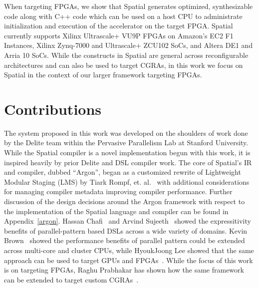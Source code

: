 When targeting FPGAs, we show that Spatial generates optimized, synthesizable
code along with C++ code which can be used on a host CPU to administrate
initialization and execution of the accelerator on the target FPGA.
Spatial currently supports Xilinx Ultrascale+ VU9P FPGAs on Amazon's
EC2 F1 Instances, Xilinx Zynq-7000 and Ultrascale+ ZCU102 SoCs, and Altera DE1 and Arria 10 SoCs.
While the constructs in Spatial are general across reconfigurable architectures
and can also be used to target CGRAs, in this work we focus on Spatial in the
context of our larger framework targeting FPGAs.

\section{Contributions}
The system proposed in this work was developed on the shoulders of work done by
the Delite team within the Pervasive Parallelism Lab at Stanford University.
While the Spatial compiler is a novel implementation begun with this work, it
is inspired heavily by prior Delite and DSL compiler work.
The core of Spatial's IR and compiler,
dubbed ``Argon'', began as a customized rewrite of Lightweight Modular Staging (LMS)
by Tiark Rompf, et. al.~\cite{tiark-thesis,lms} with additional considerations for managing
compiler metadata improving compiler performance.
Further discussion of the design decisions around the Argon framework with respect
to the implementation of the Spatial language and compiler can be found in Appendix~\ref{argon}.
Hassan Chafi~\cite{hassan-thesis} and
Arvind Sujeeth~\cite{arvind-thesis} showed the expressitivity benefits of
parallel-pattern based DSLs across a wide variety of domains.
Kevin Brown~\cite{kevin-thesis}
showed the performance benefits of parallel pattern
could be extended across multi-core and cluster CPUs, while
HyoukJoong Lee showed that the same approach can be used to target GPUs
and FPGAs~\cite{hj-thesis}. While the focus of this work is on targeting FPGAs,
Raghu Prabhakar has shown how the same framework can be
extended to target custom CGRAs~\cite{raghu-thesis}.

